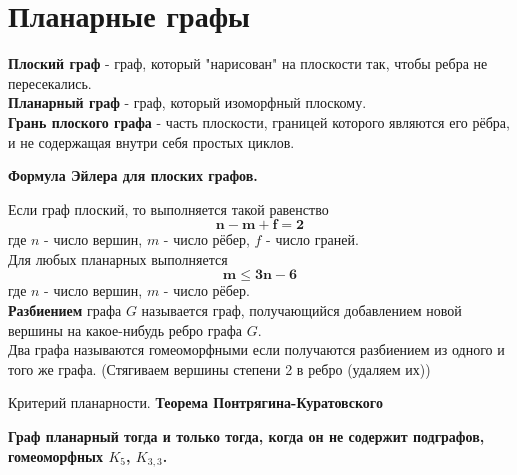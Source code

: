 \section{Планарные графы}
\textbf{Плоский граф} - граф, который "нарисован" на плоскости так, чтобы ребра не пересекались.\\
\textbf{Планарный граф} - граф, который изоморфный плоскому.\\
\textbf{Грань плоского графа} - часть плоскости, границей которого являются его рёбра, и не содержащая внутри себя простых циклов.\\
\begin{center}\textbf{Формула Эйлера для плоских графов.}\end{center}
Если граф плоский, то выполняется такой равенство
$$
\mathbf{n - m + f = 2}
$$
где $n$ - число вершин, $m$ - число рёбер, $f$ - число граней.\\
Для любых планарных выполняется
$$
\mathbf{m \leq 3n - 6}
$$
где $n$ - число вершин, $m$ - число рёбер.\\
\textbf{Разбиением} графа $G$ называется граф, получающийся добавлением новой вершины на какое-нибудь ребро графа $G$.\\
Два графа называются гомеоморфными если получаются разбиением из одного и того же графа. (Стягиваем вершины степени 2 в ребро (удаляем их))\\
\begin{center}Критерий планарности. \textbf{Теорема Понтрягина-Куратовского}\end{center}
\textbf{Граф планарный тогда и только тогда, когда он не содержит подграфов, гомеоморфных $K_5$, $K_{3,3}$.}